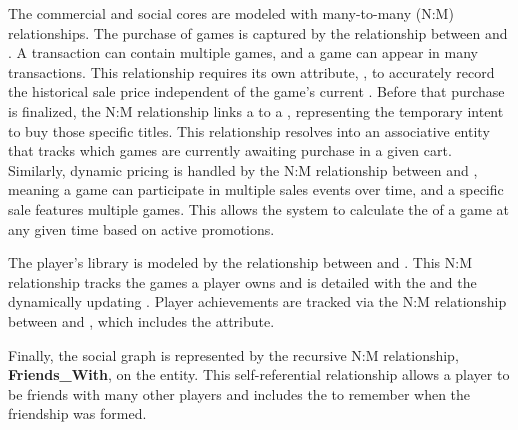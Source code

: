 The commercial and social cores are modeled with many-to-many (N:M) relationships. The purchase of games is captured by the  relationship between  and . A transaction can contain multiple games, and a game can appear in many transactions. This relationship requires its own attribute, , to accurately record the historical sale price independent of the game's current . Before that purchase is finalized, the  N:M relationship links a  to a , representing the temporary intent to buy those specific titles. This relationship resolves into an associative entity that tracks which games are currently awaiting purchase in a given cart. Similarly, dynamic pricing is handled by the  N:M relationship between  and , meaning a game can participate in multiple sales events over time, and a specific sale features multiple games. This allows the system to calculate the  of a game at any given time based on active promotions.

The player's library is modeled by the  relationship between  and . This N:M relationship tracks the games a player owns and is detailed with the  and the dynamically updating . Player achievements are tracked via the  N:M relationship between  and , which includes the  attribute.

Finally, the social graph is represented by the recursive N:M relationship, \textbf{Friends\_With}, on the  entity. This self-referential relationship allows a player to be friends with many other players and includes the  to remember when the friendship was formed.